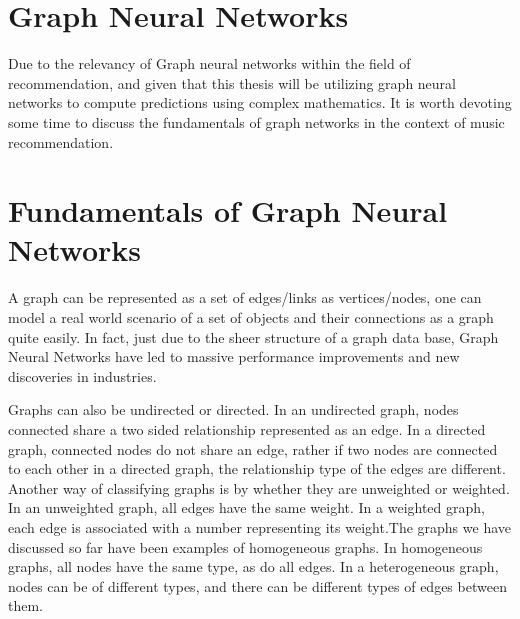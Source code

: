 \section{Graph Neural Networks}

Due to the relevancy of Graph neural networks within the field of recommendation, and given that this thesis will be utilizing graph neural networks to compute predictions using complex mathematics. It is worth devoting some time to discuss the fundamentals of graph networks in the context of music recommendation.

\section{Fundamentals of Graph Neural Networks}


A graph can be represented as a set of edges/links as vertices/nodes, one can model a real world scenario of a set of objects and their connections as a graph quite easily. In fact, just due to the sheer structure of a graph data base, Graph Neural Networks have led to massive performance improvements and new discoveries in industries. 

Graphs can also be undirected or directed. In an undirected graph, nodes connected share a two sided relationship represented as an edge. In a directed graph, connected nodes do not share an edge, rather if two nodes are connected to each other in a directed graph, the relationship type of the edges are different. Another way of classifying graphs is by whether they are unweighted or weighted. In an unweighted graph, all edges have the same weight. In a weighted graph, each edge is associated with a number representing its weight.The graphs we have discussed so far have been examples of homogeneous graphs. In homogeneous graphs, all nodes have the same type, as do all edges. In a heterogeneous graph, nodes can be of different types, and there can be different types of edges between them. 


